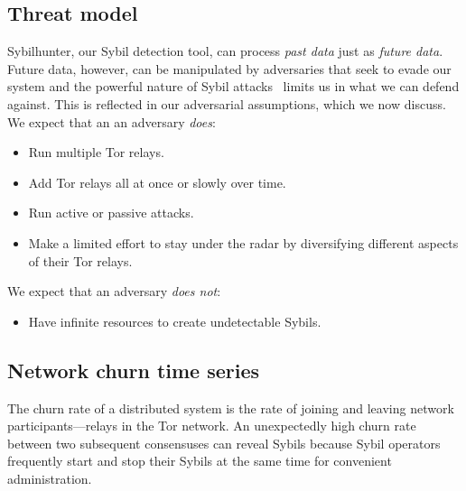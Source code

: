 \subsection{Threat model}
\label{sec:threat_model}

Sybilhunter, our Sybil detection tool, can process \emph{past data} just as
\emph{future data}.  Future data, however, can be manipulated by adversaries
that seek to evade our system and the powerful nature of Sybil
attacks~\cite{Douceur2002a} limits us in what we can defend against.  This is
reflected in our adversarial assumptions, which we now discuss.  We expect that
an an adversary \emph{does}:
\begin{itemize}
	\item Run multiple Tor relays.

	\item Add Tor relays all at once or slowly over time.

	\item Run active or passive attacks.

	\item Make a limited effort to stay under the radar by diversifying
		different aspects of their Tor relays.
\end{itemize}

We expect that an adversary \emph{does not}:
\begin{itemize}
	\item Have infinite resources to create undetectable Sybils.
\end{itemize}



\subsection{Network churn time series}
\label{sec:churn-time-series}
The churn rate of a distributed system is the rate of joining and leaving
network participants---relays in the Tor network.  An unexpectedly high churn
rate between two subsequent consensuses can reveal Sybils because Sybil
operators frequently start and stop their Sybils at the same time for convenient
administration.

